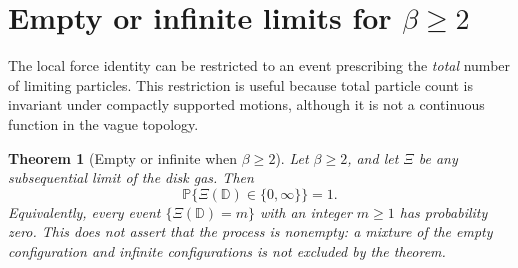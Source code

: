 \documentclass[11pt,a4paper]{article}
\numberwithin{equation}{section}
\newtheorem{theorem}{Theorem}[section]
\theoremstyle{definition}
\theoremstyle{remark}
\newcommand{\D}{\mathbb D}
\begin{document}
\section{Empty or infinite limits for \texorpdfstring{$\beta\ge2$}{beta is at least 2}}
\label{sec:finite-count-exclusion}

The local force identity can be restricted to an event prescribing the
\emph{total} number of limiting particles. This restriction is useful
because total particle count is invariant under compactly supported
motions, although it is not a continuous function in the vague topology.

\begin{theorem}[Empty or infinite when $\beta\ge2$]
\label{thm:finite-count-exclusion}
Let $\beta\ge2$, and let $\Xi$ be any subsequential limit of the disk gas.
Then
\[
 \mathbb P\{\Xi(\D)\in\{0,\infty\}\}=1.
\]
Equivalently, every event $\{\Xi(\D)=m\}$ with an integer $m\ge1$ has
probability zero. This does not assert that the process is nonempty:
a mixture of the empty configuration and infinite configurations is
not excluded by the theorem.
\end{theorem}
\end{document}
